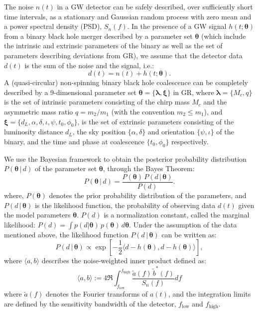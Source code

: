\documentclass[prd,preprintnumbers,twocolumn,eqsecnum,floatfix,a4paper,nofootinbib,superscriptaddress]{revtex4}
\newcommand{\blambda}{\bm{\lambda}}
\newcommand{\btheta}{\bm{\theta}}
\newcommand{\bxi}{\bm{\xi}}
\begin{document}
The noise $n(t)$ in a GW detector can be safely described, over sufficiently short time intervals, as a stationary and Gaussian random process with zero mean and a power spectral density (PSD), $S_n(f)$. In the presence of a GW signal $h(t; \btheta)$ from a binary black hole merger described by a parameter set $\btheta$ (which include the intrinsic and extrinsic parameters of the binary as well as the set of parameters describing deviations from GR), we assume that the detector data $d(t)$ is the sum of the noise and the signal, i.e.:
\begin{equation}
d(t) = n(t) + h(t; \btheta). 
\end{equation}
A (quasi-circular) non-spinning binary black hole coalescence can be completely described by a 9-dimensional parameter set $\btheta = \{ \blambda, \bxi\}$ in GR, where $\blambda = \{ M_c, q \}$ is the set of intrinsic parameters consisting of the chirp mass $M_c$ and the asymmetric mass ratio $q = m_2/m_1$ (with the convention $m_2 \leq m_1$), and $\bxi = \{ d_L, \alpha, \delta, \iota, \psi, t_0, \phi_0 \}$, is the set of extrinsic parameters consisting of the luminosity distance $d_L$, the sky position $\{\alpha, \delta\}$ and orientation $\{\psi, \iota\}$ of the binary, and the time and phase at coalescence $\{t_0, \phi_0\}$ respectively.

We use the Bayesian framework to obtain the posterior probability distribution $P({\btheta} \, | \, d)$ of the parameter set $\btheta$, through the Bayes Theorem:
\begin{equation}
P({\btheta} \, | \, d) = \frac{P({\btheta}) \, P (d \, | \, {\btheta})}{P(d)}.
\label{eq:Bayes_theorem}
\end{equation} 
where, $P({\btheta})$ denotes the prior probability distribution of the parameters, and $P (d \, | \, {\btheta})$ is the likelihood function, the probability of observing data $d(t)$ given the model parameters $\btheta$. $P(d)$ is a normalization constant, called the marginal likelihood: $P(d) = \int p(d|\btheta) \, p(\btheta) \, d\btheta$. Under the assumption of the data mentioned above, the likelihood function $P(d \, | \, {\btheta})$ can be written as:
\begin{equation}
P (d \, | \, {\btheta}) \propto \exp \left[ -\frac{1}{2} \langle d - h({\btheta}), d - h({\btheta}) \rangle \right],
\end{equation}
where $\langle a, b \rangle$ describes the noise-weighted inner product defined as:
\begin{equation}
\langle a, b \rangle := 4 \Re \int_{f_\mathrm{low}}^{f_\mathrm{high}} \frac{\tilde{a}(f) \, \tilde{b}^*(f)}{S_n(f)}df
\end{equation}
where $\tilde{a}(f)$ denotes the Fourier transforms of $a(t)$, and the integration limits are defined by the sensitivity bandwidth of the detector, $f_\mathrm{low}$ and $f_\mathrm{high}$.
\end{document}
